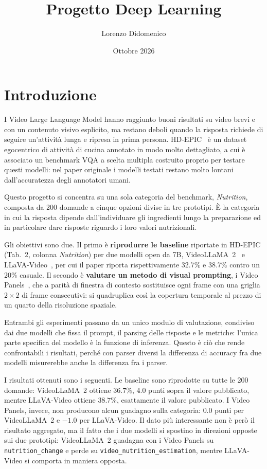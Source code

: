 \documentclass{article}
\title{Progetto Deep Learning}
\author{Lorenzo Didomenico}
\date{Ottobre 2026}
\begin{document}
\maketitle
 \clearpage
\tableofcontents
\clearpage %

\section{Introduzione}

I Video Large Language Model hanno raggiunto buoni risultati su video brevi e
con un contenuto visivo esplicito, ma restano deboli quando la risposta richiede
di seguire un'attività lunga e ripresa in prima persona. HD-EPIC~\cite{hdepic} è
un dataset egocentrico di attività di cucina annotato in modo molto dettagliato,
a cui è associato un benchmark VQA a scelta multipla costruito proprio per
testare questi modelli: nel paper originale i modelli testati restano molto
lontani dall'accuratezza degli annotatori umani.

Questo progetto si concentra su una sola categoria del benchmark, \emph{Nutrition},
composta da 200 domande a cinque opzioni divise in tre prototipi. È la categoria
in cui la risposta dipende dall'individuare gli ingredienti lungo la preparazione ed in particolare dare risposte riguardo i loro valori nutrizionali.

Gli obiettivi sono due. Il primo è \textbf{riprodurre le baseline} riportate in
HD-EPIC (Tab.~2, colonna \emph{Nutrition}) per due modelli open da 7B,
VideoLLaMA~2~\cite{videollama2} e LLaVA-Video~\cite{llavavideo}, per cui il
paper riporta rispettivamente 32.7\% e 38.7\% contro un 20\% casuale. Il secondo
è \textbf{valutare un metodo di visual prompting}, i Video
Panels~\cite{videopanels}, che a parità di finestra di contesto sostituisce ogni
frame con una griglia $2\times2$ di frame consecutivi: si quadruplica
così la copertura temporale al prezzo di un quarto della risoluzione spaziale.

Entrambi gli esperimenti passano da un unico modulo di valutazione, condiviso
dai due modelli che fissa il prompt, il parsing delle risposte e le metriche:
l'unica parte specifica del modello è la funzione di inferenza. Questo è ciò che
rende confrontabili i risultati, perché con parser diversi la differenza di
accuracy fra due modelli misurerebbe anche la differenza fra i parser.

I risultati ottenuti sono i seguenti. Le baseline sono riprodotte su tutte le
200 domande: VideoLLaMA~2 ottiene $36.7\%$, $4.0$ punti sopra il valore
pubblicato, mentre LLaVA-Video ottiene $38.7\%$, esattamente il valore
pubblicato. I Video Panels, invece, non producono alcun guadagno
sulla categoria: $0.0$ punti per VideoLLaMA~2 e $-1.0$ per LLaVA-Video. Il dato
più interessante non è però il risultato aggregato, ma il fatto che i due
modelli si spostino in direzioni opposte sui due prototipi: VideoLLaMA~2 guadagna con i Video Panels su \texttt{nutrition\_change} e perde su \texttt{video\_nutrition\_estimation}, mentre LLaVA-Video si comporta in maniera opposta.
\end{document}
